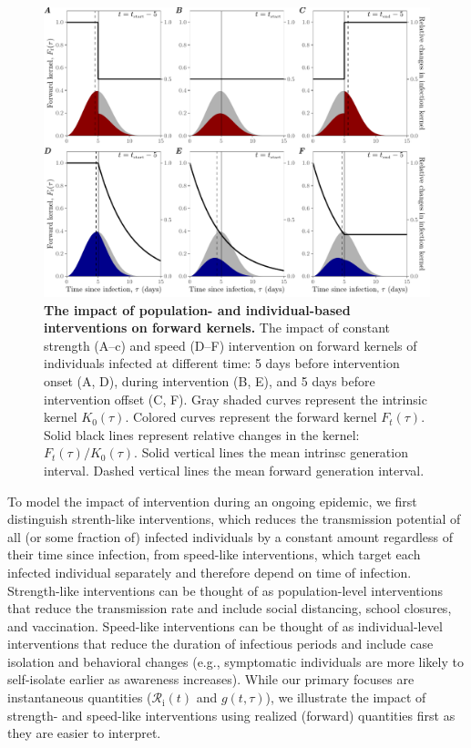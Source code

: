 \documentclass[12pt]{article}
\newcommand{\Rx}[1]{\ensuremath{{\mathcal R}_{#1}}\xspace}
\newcommand{\Ri}{\Rx{\mathrm{i}}}
\begin{document}
\begin{figure}[!th]
\includegraphics[width=1\textwidth]{pop_ind_compare.pdf}
\caption{
\textbf{The impact of population- and individual-based interventions on forward kernels.}
The impact of constant strength (A--c) and speed (D--F) intervention on forward kernels of individuals infected at different time:
5 days before intervention onset (A, D), during intervention (B, E), and 5 days before intervention offset (C, F).
Gray shaded curves represent the intrinsic kernel $K_0(\tau)$.
Colored curves represent the forward kernel $F_t(\tau)$.
Solid black lines represent relative changes in the kernel: $F_t(\tau)/K_0(\tau)$.
Solid vertical lines the mean intrinsc generation interval.
Dashed vertical lines the mean forward generation interval.
}
\label{fig:indpop}
\end{figure}

To model the impact of intervention during an ongoing epidemic, we first distinguish strenth-like interventions, which reduces the transmission potential of all (or some fraction of) infected individuals by a constant amount regardless of their time since infection, from speed-like interventions, which target each infected individual separately and therefore depend on time of infection.
Strength-like interventions can be thought of as population-level interventions that reduce the transmission rate and include social distancing, school closures, and vaccination.
Speed-like interventions can be thought of as individual-level interventions that reduce the duration of infectious periods and include case isolation and behavioral changes (e.g., symptomatic individuals are more likely to self-isolate earlier as awareness increases).
While our primary focuses are instantaneous quantities ($\Ri(t)$ and $g(t, \tau)$), we illustrate the impact of strength- and speed-like interventions using realized (forward) quantities first as they are easier to interpret.
\end{document}
